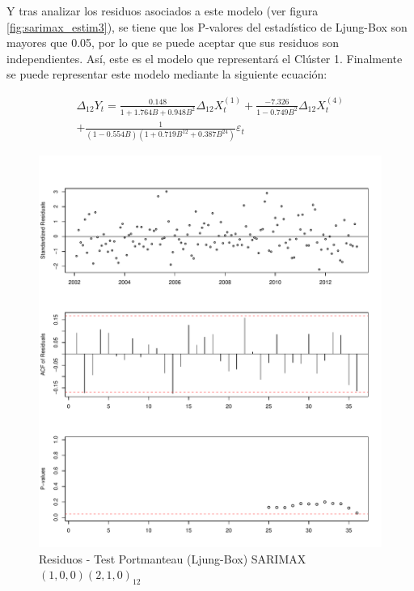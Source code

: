 \documentclass[12pt,oneside]{book}\usepackage[]{graphicx}\usepackage[]{color}
\makeatletter
\def\maxwidth{ %
  \ifdim\Gin@nat@width>\linewidth
    \linewidth
  \else
    \Gin@nat@width
  \fi
}
\newenvironment{knitrout}{}{} %
\theoremstyle{definition} %
\makeatother
\begin{document}
Y tras analizar los residuos asociados a este modelo (ver figura \ref{fig:sarimax_estim3}), se tiene que los P-valores del estadístico de Ljung-Box son mayores que 0.05, por lo que se puede aceptar que sus residuos son independientes. Así, este es el modelo que representará el Clúster 1. Finalmente se puede representar este modelo mediante la siguiente ecuación:


\begin{eqnarray} \label{eq:sarimax}
\Delta_{12} Y_t = \frac{0.148 }{1+ 1.764B + 0.948B^2} \Delta_{12} X^{(1)}_t + \frac{-7.326 }{1 - 0.749B^2} \Delta_{12} X^{(4)}_t     \nonumber\\
+ \frac{1}{( 1 - 0.554 B )(1+ 0.719 B^{12} +0.387 B^{24} )  }\varepsilon_t                  \label{prime}
\end{eqnarray}


\begin{knitrout}
\color{fgcolor}\begin{figure}[h]

{\centering \includegraphics[width=\maxwidth]{figure/unnamed-chunk-57-1} 

}

\caption{\label{fig:sarimax_estim3} Residuos - Test Portmanteau (Ljung-Box) SARIMAX $(1,0,0)(2,1,0)_{12}$}\label{fig:unnamed-chunk-57}
\end{figure}


\end{knitrout}
\end{document}
